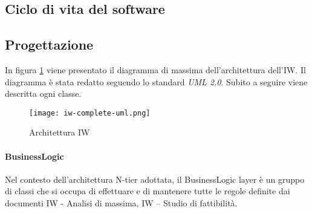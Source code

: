 \subsection{Ciclo di vita del software}
\label{sec:ciclo-vita-software}

\subsection{Progettazione}
\label{sec:progettazione}
In figura \ref{fig:ark-mod-iw} viene presentato il diagramma di massima dell’architettura dell’IW. Il diagramma è stata redatto seguendo lo standard \emph{UML 2.0}. Subito a seguire viene descritta ogni classe.
\begin{figure}[htbp]
    
    \centering
    \texttt{[image: iw-complete-uml.png]} 
    \caption{Architettura IW}
    \label{fig:ark-mod-iw} 
\end{figure}

\paragraph{BusinessLogic} %
Nel contesto dell’architettura N-tier adottata, il BusinessLogic layer è un gruppo di classi che si occupa di effettuare e di mantenere tutte le regole definite dai documenti IW - Analisi di massima, IW – Studio di fattibilità.  

